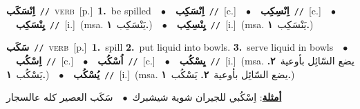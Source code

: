 \documentclass[10pt,a4paper,twoside]{article} %
\begin{document}
\begin{multicols}{2}
{\setlength\topsep{0pt}\textbf{\foreignlanguage{arabic}{اِنْسَكَب}}\ {\color{gray}\texttt{//}\color{black}}\ \textsc{verb}\ [p.]\ \textbf{1.}~be spilled\ \ $\bullet$\ \ \setlength\topsep{0pt}\textbf{\foreignlanguage{arabic}{اِنْسَكِب}}\ {\color{gray}\texttt{//}\color{black}}\ [c.]\ \ $\bullet$\ \ \setlength\topsep{0pt}\textbf{\foreignlanguage{arabic}{اِنْسِكِب}}\ {\color{gray}\texttt{//}\color{black}}\ [c.]\ \ $\bullet$\ \ \setlength\topsep{0pt}\textbf{\foreignlanguage{arabic}{يِنْسَكِب}}\ {\color{gray}\texttt{//}\color{black}}\ [i.]\ \color{gray}(msa. \foreignlanguage{arabic}{يَنْسَكِب}~\foreignlanguage{arabic}{\textbf{١.}})\color{black}\ \ $\bullet$\ \ \setlength\topsep{0pt}\textbf{\foreignlanguage{arabic}{يِنْسِكِب}}\ {\color{gray}\texttt{//}\color{black}}\ [i.]\ \color{gray}(msa. \foreignlanguage{arabic}{يَنْسَكِب}~\foreignlanguage{arabic}{\textbf{١.}})\color{black}\ } \vspace{2mm}

{\setlength\topsep{0pt}\textbf{\foreignlanguage{arabic}{سَكَب}}\ {\color{gray}\texttt{//}\color{black}}\ \textsc{verb}\ [p.]\ \textbf{1.}~spill  \textbf{2.}~put liquid into bowls.  \textbf{3.}~serve liquid in bowls\ \ $\bullet$\ \ \setlength\topsep{0pt}\textbf{\foreignlanguage{arabic}{اِسْكُب}}\ {\color{gray}\texttt{//}\color{black}}\ [c.]\ \ $\bullet$\ \ \setlength\topsep{0pt}\textbf{\foreignlanguage{arabic}{اُسْكُب}}\ {\color{gray}\texttt{//}\color{black}}\ [c.]\ \ $\bullet$\ \ \setlength\topsep{0pt}\textbf{\foreignlanguage{arabic}{يِسْكُب}}\ {\color{gray}\texttt{//}\color{black}}\ [i.]\ \color{gray}(msa. \foreignlanguage{arabic}{يضع السّائِل بأوعية}~\foreignlanguage{arabic}{\textbf{٢.}}  \foreignlanguage{arabic}{يَسْكُب}~\foreignlanguage{arabic}{\textbf{١.}})\color{black}\ \ $\bullet$\ \ \setlength\topsep{0pt}\textbf{\foreignlanguage{arabic}{يُسْكُب}}\ {\color{gray}\texttt{//}\color{black}}\ [i.]\ \color{gray}(msa. \foreignlanguage{arabic}{يضع السّائِل بأوعية}~\foreignlanguage{arabic}{\textbf{٢.}}  \foreignlanguage{arabic}{يَسْكُب}~\foreignlanguage{arabic}{\textbf{١.}})\color{black}\  \begin{flushright}\color{gray}\foreignlanguage{arabic}{\textbf{\underline{\foreignlanguage{arabic}{أمثلة}}}: اِسْكُبي للجيران شوية شيشبرك\ $\bullet$\ \  سَكَب العصير كله عالسجار}\end{flushright}\color{black}} \vspace{2mm}


\end{multicols}
\end{document}
